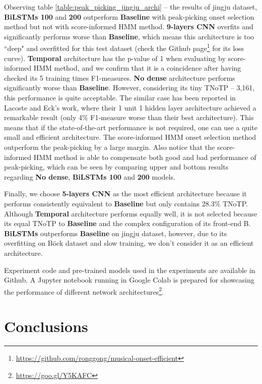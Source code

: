 Observing table \ref{table:peak_picking_jingju_archi} -- the results of jingju dataset, \textbf{BiLSTMs 100} and \textbf{200} outperform \textbf{Baseline} with peak-picking onset selection method but not with score-informed HMM method. \textbf{9-layers CNN} overfits and significantly performs worse than \textbf{Baseline}, which means this architecture is too ``deep" and overfitted for this test dataset (check the Github page\footnote{\url{https://github.com/ronggong/musical-onset-efficient}\label{fn:github}} for its loss curve). \textbf{Temporal} architecture has the p-value of 1 when evaluating by score-informed HMM method, and we confirm that it is a coincidence after having checked its 5 training times F1-measures. \textbf{No dense} architecture performs significantly worse than \textbf{Baseline}. However, considering its tiny TNoTP -- 3,161, this performance is quite acceptable. The similar case has been reported in Lacoste and Eck's work\cite{Lacoste2007a}, where their 1 unit 1 hidden layer architecture achieved a remarkable result (only 4\% F1-measure worse than their best architecture). This means that if the state-of-the-art performance is not required, one can use a quite small and efficient architecture. The score-informed HMM onset selection method outperform the peak-picking by a large margin. Also notice that the score-informed HMM method is able to compensate both good and bad performance of peak-picking, which can be seen by comparing upper and bottom results regarding \textbf{No dense}, \textbf{BiLSTMs 100} and \textbf{200} models.

Finally, we choose \textbf{5-layers CNN} as the most efficient architecture because it performs consistently equivalent to \textbf{Baseline} but only contains 28.3\% TNoTP. Although \textbf{Temporal} architecture performs equally well, it is not selected because its equal TNoTP to \textbf{Baseline} and the complex configuration of its front-end B. \textbf{BiLSTMs} outperforms \textbf{Baseline} on jingju dataset, however, due to its overfitting on B\"{o}ck dataset and slow training, we don't consider it as an efficient architecture.

Experiment code
and pre-trained models used in the experiments are available in Github. A Jupyter notebook running in Google Colab is prepared for showcasing the performance of different network architectures\footnote{\url{https://goo.gl/Y5KAFC}}. 

\section{Conclusions}


